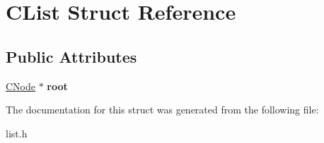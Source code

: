 \hypertarget{structCList}{\section{C\-List Struct Reference}
\label{structCList}
}
\subsection*{Public Attributes}
\begin{DoxyCompactItemize}
\item 
\hypertarget{structCList_a9af4d9ac24bc4985288986c825b635ea}{\hyperlink{structCNode}{C\-Node} $\ast$ {\bfseries root}}\label{structCList_a9af4d9ac24bc4985288986c825b635ea}

\end{DoxyCompactItemize}


The documentation for this struct was generated from the following file\-:\begin{DoxyCompactItemize}
\item 
list.\-h\end{DoxyCompactItemize}
